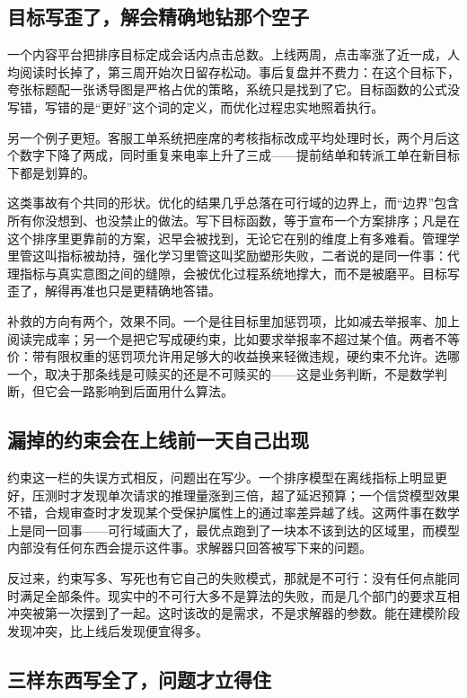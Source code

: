 \subsection{目标写歪了，解会精确地钻那个空子}

一个内容平台把排序目标定成会话内点击总数。上线两周，点击率涨了近一成，人均阅读时长掉了，第三周开始次日留存松动。事后复盘并不费力：在这个目标下，夸张标题配一张诱导图是严格占优的策略，系统只是找到了它。目标函数的公式没写错，写错的是``更好''这个词的定义，而优化过程忠实地照着执行。

另一个例子更短。客服工单系统把座席的考核指标改成平均处理时长，两个月后这个数字下降了两成，同时重复来电率上升了三成——提前结单和转派工单在新目标下都是划算的。

这类事故有个共同的形状。优化的结果几乎总落在可行域的边界上，而``边界''包含所有你没想到、也没禁止的做法。写下目标函数，等于宣布一个方案排序；凡是在这个排序里更靠前的方案，迟早会被找到，无论它在别的维度上有多难看。管理学里管这叫指标被劫持，强化学习里管这叫奖励塑形失败，二者说的是同一件事：代理指标与真实意图之间的缝隙，会被优化过程系统地撑大，而不是被磨平。目标写歪了，解得再准也只是更精确地答错。

补救的方向有两个，效果不同。一个是往目标里加惩罚项，比如减去举报率、加上阅读完成率；另一个是把它写成硬约束，比如要求举报率不超过某个值。两者不等价：带有限权重的惩罚项允许用足够大的收益换来轻微违规，硬约束不允许。选哪一个，取决于那条线是可赎买的还是不可赎买的——这是业务判断，不是数学判断，但它会一路影响到后面用什么算法。

\subsection{漏掉的约束会在上线前一天自己出现}

约束这一栏的失误方式相反，问题出在写少。一个排序模型在离线指标上明显更好，压测时才发现单次请求的推理量涨到三倍，超了延迟预算；一个信贷模型效果不错，合规审查时才发现某个受保护属性上的通过率差异越了线。这两件事在数学上是同一回事——可行域画大了，最优点跑到了一块本不该到达的区域里，而模型内部没有任何东西会提示这件事。求解器只回答被写下来的问题。

反过来，约束写多、写死也有它自己的失败模式，那就是不可行：没有任何点能同时满足全部条件。现实中的不可行大多不是算法的失败，而是几个部门的要求互相冲突被第一次摆到了一起。这时该改的是需求，不是求解器的参数。能在建模阶段发现冲突，比上线后发现便宜得多。

\subsection{三样东西写全了，问题才立得住}

